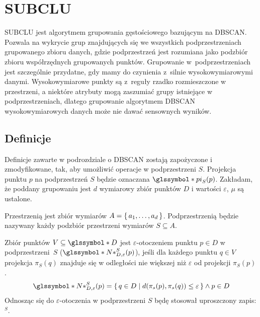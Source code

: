 \section{SUBCLU}

SUBCLU \cite{subclu} jest algorytmem grupowania gęstościowego bazującym na \linebreak DBSCAN. Pozwala na wykrycie grup znajdujących się we wszystkich podprzestrzeniach grupowanego zbioru danych, gdzie podprzestrzeń jest rozumiana jako podzbiór zbioru współrzędnych grupowanych punktów. Grupowanie \mbox{w podprzestrzeniach} jest szczególnie przydatne, gdy mamy do czynienia \mbox{z silnie} wysokowymiarowymi danymi. Wysokowymiarowe punkty są \mbox{z reguły} rzadko rozmieszczone w przestrzeni, a niektóre atrybuty mogą zaszumiać grupy istniejące w podprzestrzeniach, dlatego grupowanie algorytmem DBSCAN wysokowymiarowych danych może nie dawać sensownych wyników.

\subsection{Definicje}
Definicje zawarte w podrozdziale o DBSCAN zostają zapożyczone i zmodyfikowane, tak, aby umożliwić operacje w podprzestrzeni $ S $. Projekcja punktu $ p $ na podprzestrzeń $ S $ będzie oznaczana $ \s{pi}_S(p) $. Zakładam, że poddany grupowaniu jest $ d $ wymiarowy zbiór punktów $ D $ i wartości $ \varepsilon $, $ \mu $ są ustalone.
\smallskip
\smallskip

\newline
 Przestrzenią jest zbiór wymiarów $ A=\set{a_1,\dots,a_d} $. Podprzestrzenią będzie nazywany każdy podzbiór przestrzeni wymiarów $ S \subseteq A $.
\smallskip

\newline
Zbiór punktów $ V \subseteq \s{D} $ jest $ \varepsilon $-otoczeniem punktu $ p\in D $ w \mbox{podprzestrzeni $ S $} ($ \s{N*}^S_{D,\varepsilon}(p) $), jeśli dla każdego punktu $ q \in V $ projekcja $ \pi_S(q) $ znajduje się w odległości nie większej niż $ \varepsilon $ od projekcji $ \pi_S(p) $.
\begin{equation}
	\s{N*}^S_{D,\varepsilon}(p) = \set{q \in D | d(\pi_s(p), \pi_s(q)) \le \varepsilon} \land p\in D
\end{equation}
Odnosząc się do $ \varepsilon $-otoczenia w podprzestrzeni $ S $ będę stosował uproszczony zapis: \textit{$^S$}.
\smallskip

